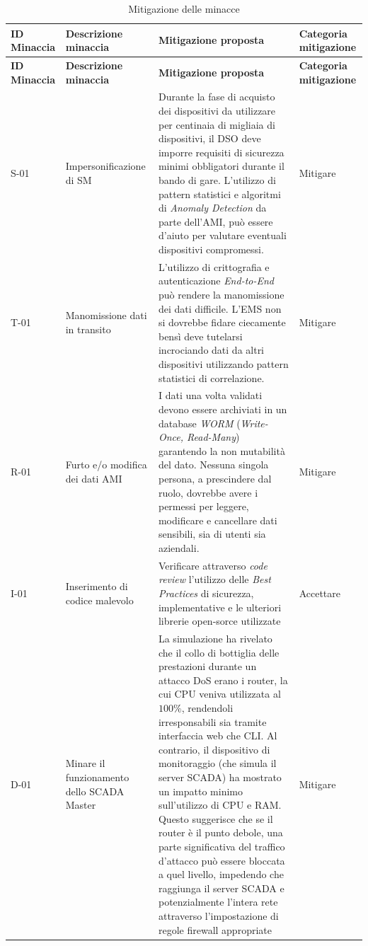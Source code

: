 \renewcommand{\arraystretch}{1.5}
\begin{longtable}{p{1.5cm}p{3.5cm}p{8cm}p{2.5cm}}
    
    
    \caption{Mitigazione delle minacce} \\
    
    \hline
    \textbf{ID Minaccia }& \textbf{Descrizione minaccia} & \textbf{Mitigazione proposta} & \textbf{Categoria mitigazione}\\
    \hline
    \endfirsthead
    
    \hline
    \textbf{ID Minaccia }& \textbf{Descrizione minaccia} & \textbf{Mitigazione proposta} & \textbf{Categoria mitigazione}\\
    \hline
    \endhead

    S-01 & Impersonificazione di SM & Durante la fase di acquisto dei dispositivi da utilizzare per centinaia di migliaia di dispositivi, il DSO deve imporre requisiti di sicurezza minimi obbligatori durante il bando di gare. L'utilizzo di pattern statistici e algoritmi di \textit{Anomaly Detection} da parte dell'AMI, può essere d'aiuto per valutare eventuali dispositivi compromessi. & Mitigare \\
    
    T-01 & Manomissione dati in transito & L'utilizzo di crittografia e autenticazione \textit{End-to-End} può rendere la manomissione dei dati difficile. L'EMS non si dovrebbe fidare ciecamente bensì deve tutelarsi incrociando dati da altri dispositivi utilizzando pattern statistici di correlazione. \cite{paper-threat-modelling} & Mitigare \\

    R-01 & Furto e/o modifica dei dati AMI & I dati una volta validati devono essere archiviati in un database \textit{WORM} (\textit{Write-Once, Read-Many}) garantendo la non mutabilità del dato. Nessuna singola persona, a prescindere dal ruolo, dovrebbe avere i permessi per leggere, modificare e cancellare dati sensibili, sia di utenti sia aziendali. & Mitigare\\

    I-01 & Inserimento di codice malevolo & Verificare attraverso \textit{code review} l'utilizzo delle \textit{Best Practices} di sicurezza, implementative e le ulteriori librerie open-sorce utilizzate & Accettare \\

    D-01 & Minare il funzionamento dello SCADA Master & La simulazione ha rivelato che il collo di bottiglia delle prestazioni durante un attacco DoS erano i router, la cui CPU veniva utilizzata al $100\%$, rendendoli irresponsabili sia tramite interfaccia web che CLI. Al contrario, il dispositivo di monitoraggio (che simula il server SCADA) ha mostrato un impatto minimo sull'utilizzo di CPU e RAM. Questo suggerisce che se il router è il punto debole, una parte significativa del traffico d'attacco può essere bloccata a quel livello, impedendo che raggiunga il server SCADA e potenzialmente l'intera rete attraverso l'impostazione di regole firewall appropriate \cite{threat-sotto-stazioni-paper}  &  Mitigare \\


\end{longtable}
